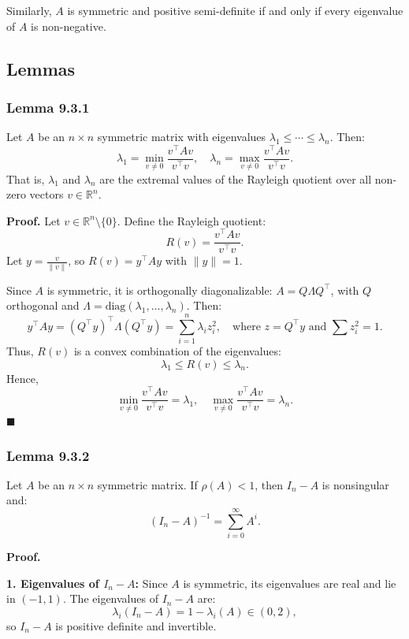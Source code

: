 \documentclass[hidelinks,12pt]{article}
\begin{document}
\noindent Similarly, \( A \) is symmetric and positive semi-definite if and only if every eigenvalue of \( A \) is non-negative.

\subsection{Lemmas}

\subsubsection*{\textbf{Lemma 9.3.1}}
Let \( A \) be an \( n \times n \) symmetric matrix with eigenvalues \( \lambda_1 \leq \cdots \leq \lambda_n \). Then:
\[
\lambda_1 = \min_{v \neq 0} \frac{v^\top A v}{v^\top v}, \quad \lambda_n = \max_{v \neq 0} \frac{v^\top A v}{v^\top v}.
\]
That is, \( \lambda_1 \) and \( \lambda_n \) are the extremal values of the Rayleigh quotient over all non-zero vectors \( v \in \mathbb{R}^n \).

\noindent \textbf{Proof.} Let \( v \in \mathbb{R}^n \setminus \{0\} \). Define the Rayleigh quotient:
\[
R(v) = \frac{v^\top A v}{v^\top v}.
\]
Let \( y = \frac{v}{\|v\|} \), so \( R(v) = y^\top A y \) with \( \|y\| = 1 \).

\noindent Since \( A \) is symmetric, it is orthogonally diagonalizable: \( A = Q \Lambda Q^\top \), with \( Q \) orthogonal and \( \Lambda = \text{diag}(\lambda_1, \dots, \lambda_n) \). Then:
\[
y^\top A y = (Q^\top y)^\top \Lambda (Q^\top y) = \sum_{i=1}^{n} \lambda_i z_i^2, \quad \text{where } z = Q^\top y \text{ and } \sum z_i^2 = 1.
\]
Thus, \( R(v) \) is a convex combination of the eigenvalues:
\[
\lambda_1 \leq R(v) \leq \lambda_n.
\]
Hence,
\[
\min_{v \neq 0} \frac{v^\top A v}{v^\top v} = \lambda_1, \quad \max_{v \neq 0} \frac{v^\top A v}{v^\top v} = \lambda_n.
\] \hfill \(\blacksquare\)
\vspace{1cm}
\subsubsection*{\textbf{Lemma 9.3.2}} 
Let \( A \) be an \( n \times n \) symmetric matrix. If \( \rho(A) < 1 \), then \( I_n - A \) is nonsingular and:
\[
(I_n - A)^{-1} = \sum_{i=0}^{\infty} A^i.
\]

\noindent \textbf{Proof.}

\noindent \textbf{1. Eigenvalues of \( I_n - A \):}  
Since \( A \) is symmetric, its eigenvalues are real and lie in \( (-1, 1) \). The eigenvalues of \( I_n - A \) are:
\[
\lambda_i(I_n - A) = 1 - \lambda_i(A) \in (0, 2),
\]
so \( I_n - A \) is positive definite and invertible.
\end{document}
